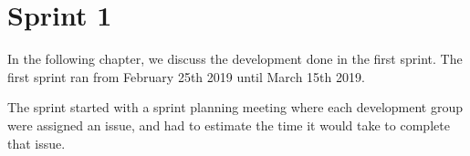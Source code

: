 \chapter{Sprint 1}
In the following chapter, we discuss the development done in the first sprint.
The first sprint ran from February 25th 2019 until March 15th 2019.

The sprint started with a sprint planning meeting where each development group were assigned an issue, and had to estimate the time it would take to complete that issue.